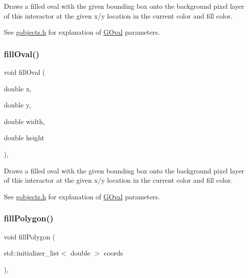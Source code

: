 Draws a filled oval with the given bounding box onto the background pixel layer of this interactor at the given x/y location in the current color and fill color. 

See \mbox{\hyperlink{gobjects_8h_source}{gobjects.\+h}} for explanation of \mbox{\hyperlink{classGOval}{G\+Oval}} parameters. \mbox{\label{classGDrawingSurface_a28c700c82f31cd328a4629273420ee61}} 
\subsubsection{\texorpdfstring{fill\+Oval()}{fillOval()}\hspace{0.1cm}{\footnotesize\ttfamily [2/2]}}
{\footnotesize\ttfamily void fill\+Oval (\begin{DoxyParamCaption}\item[{double}]{x,  }\item[{double}]{y,  }\item[{double}]{width,  }\item[{double}]{height }\end{DoxyParamCaption})\hspace{0.3cm}{\ttfamily [virtual]}, {\ttfamily [inherited]}}



Draws a filled oval with the given bounding box onto the background pixel layer of this interactor at the given x/y location in the current color and fill color. 

See \mbox{\hyperlink{gobjects_8h_source}{gobjects.\+h}} for explanation of \mbox{\hyperlink{classGOval}{G\+Oval}} parameters. \mbox{\label{classGDrawingSurface_a15f8c1c4409ef51c1a30a92a195b8f66}} 
\subsubsection{\texorpdfstring{fill\+Polygon()}{fillPolygon()}}
{\footnotesize\ttfamily void fill\+Polygon (\begin{DoxyParamCaption}\item[{std\+::initializer\+\_\+list$<$ double $>$}]{coords }\end{DoxyParamCaption})\hspace{0.3cm}{\ttfamily [virtual]}, {\ttfamily [inherited]}}



